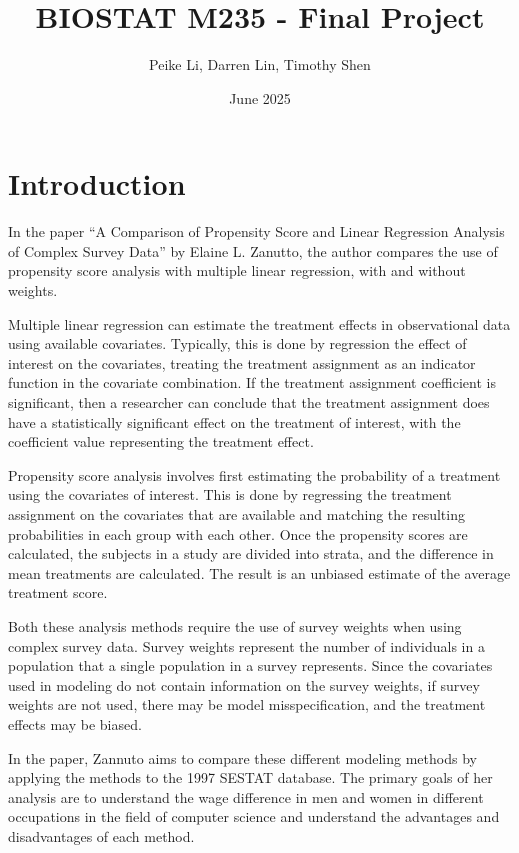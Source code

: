 \documentclass[12pt]{article}
\title{BIOSTAT M235 - Final Project}
\author{Peike Li, Darren Lin, Timothy Shen}
\date{June 2025}
\begin{document}
\doublespacing


\maketitle

\newpage

\section{Introduction}

In the paper “A Comparison of Propensity Score and Linear Regression Analysis of Complex Survey Data” by Elaine L. Zanutto, the author compares the use of propensity score analysis with multiple linear regression, with and without weights.

Multiple linear regression can estimate the treatment effects in observational data using available covariates. Typically, this is done by regression the effect of interest on the covariates, treating the treatment assignment as an indicator function in the covariate combination. If the treatment assignment coefficient is significant, then a researcher can conclude that the treatment assignment does have a statistically significant effect on the treatment of interest, with the coefficient value representing the treatment effect.

Propensity score analysis involves first estimating the probability of a treatment using the covariates of interest. This is done by regressing the treatment assignment on the covariates that are available and matching the resulting probabilities in each group with each other. Once the propensity scores are calculated, the subjects in a study are divided into strata, and the difference in mean treatments are calculated. The result is an unbiased estimate of the average treatment score.

Both these analysis methods require the use of survey weights when using complex survey data. Survey weights represent the number of individuals in a population that a single population in a survey represents. Since the covariates used in modeling do not contain information on the survey weights, if survey weights are not used, there may be model misspecification, and the treatment effects may be biased.

In the paper, Zannuto aims to compare these different modeling methods by applying the methods to the 1997 SESTAT database. The primary goals of her analysis are to understand the wage difference in men and women in different occupations in the field of computer science and understand the advantages and disadvantages of each method.
\end{document}
